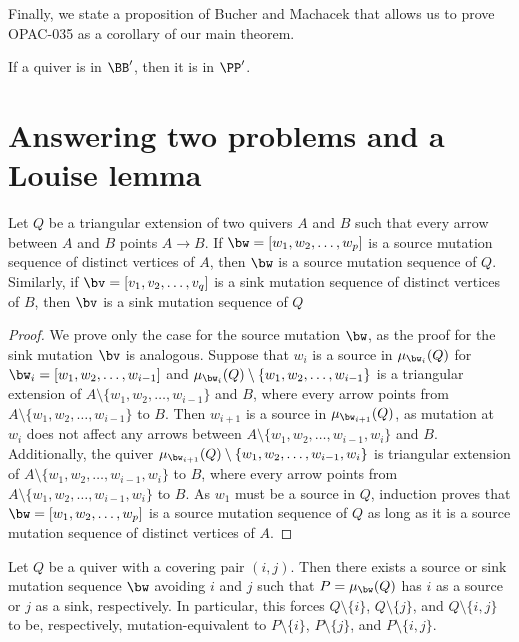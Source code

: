 Finally, we state a proposition of Bucher and Machacek that allows us to prove OPAC-035 as a corollary of our main theorem.

\begin{prop}{\cite[Proposition 3.4]{MR4108215}} \label{prop-banff-p-containment}
    If a quiver is in $\BB'$, then it is in $\PP'$.
\end{prop}

\section{Answering two problems and a Louise lemma}\label{sec-proof}

\begin{lemm} \label{lem-triangular-extension-source-sink}
    Let $Q$ be a triangular extension of two quivers $A$ and $B$ such that every arrow between $A$ and $B$ points $A \to B$.
    If $\bw = [w_1, w_2, \dots, w_p]$ is a source mutation sequence of distinct vertices of $A$, then $\bw$ is a source mutation sequence of $Q$.
    Similarly, if $\bv = [v_1, v_2, \dots, v_q]$ is a sink mutation sequence of distinct vertices of $B$, then $\bv$ is a sink mutation sequence of $Q$
\end{lemm}

\begin{proof}
    We prove only the case for the source mutation $\bw$, as the proof for the sink mutation $\bv$ is analogous. 
    Suppose that $w_i$ is a source in $\mu_{\bw_i}(Q)$ for $\bw_i = [w_1, w_2, \dots, w_{i-1}]$ and $\mu_{\bw_i}(Q) \setminus \{w_1,w_2,\dots, w_{i-1}\}$ is a triangular extension of $A \setminus \{w_1,w_2,\dots, w_{i-1}\}$ and $B$, where every arrow points from $A \setminus \{w_1,w_2,\dots, w_{i-1}\}$ to $B$.
    Then $w_{i+1}$ is a source in $\mu_{\bw_{i+1}}(Q)$, as mutation at $w_i$ does not affect any arrows between $A \setminus \{w_1,w_2,\dots, w_{i-1}, w_i\}$ and $B$.
    Additionally, the quiver $\mu_{\bw_{i+1}}(Q) \setminus \{w_1,w_2,\dots, w_{i-1}, w_i\}$ is triangular extension of $A \setminus \{w_1,w_2,\dots, w_{i-1}, w_i\}$ to $B$, where every arrow points from $A \setminus \{w_1,w_2,\dots, w_{i-1}, w_i\}$ to $B$.
    As $w_1$ must be a source in $Q$, induction proves that $\bw = [w_1, w_2, \dots, w_p]$ is a source mutation sequence of $Q$ as long as it is a source mutation sequence of distinct vertices of $A$.
\end{proof}

\begin{lemm} \label{lem-covering-pair-mutation}
    Let $Q$ be a quiver with a covering pair $(i,j)$.
    Then there exists a source or sink mutation sequence $\bw$ avoiding $i$ and $j$ such that $P = \mu_\bw(Q)$ has $i$ as a source or $j$ as a sink, respectively.
    In particular, this forces $Q \setminus \{i\}$, $Q \setminus \{j\}$, and $Q \setminus \{i,j\}$ to be, respectively, mutation-equivalent to $P \setminus \{i\}$, $P \setminus \{j\}$, and $P \setminus \{i,j\}$.
\end{lemm}

